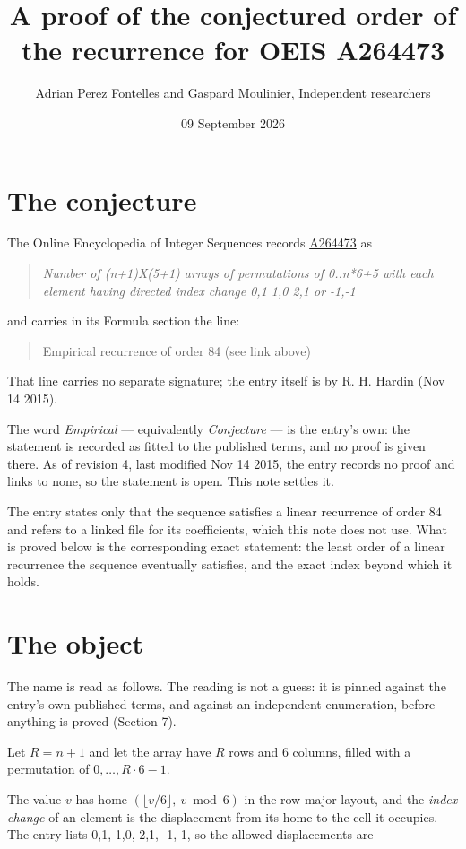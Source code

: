 \documentclass[11pt]{article}
\title{A proof of the conjectured order of the recurrence for OEIS A264473}
\author{Adrian Perez Fontelles and Gaspard Moulinier, Independent researchers}
\date{09 September 2026}
\theoremstyle{definition}
\begin{document}
\maketitle
\section{The conjecture}

The Online Encyclopedia of Integer Sequences records \href{https://oeis.org/A264473}{A264473} as

\begin{quote}\itshape Number of (n+1)X(5+1) arrays of permutations of 0..n*6+5 with each element having directed index change 0,1 1,0 2,1 or -1,-1\end{quote}

and carries in its Formula section the line:

\begin{quote}\ttfamily Empirical recurrence of order 84 (see link above)\end{quote}

That line carries no separate signature; the entry itself is by R. H. Hardin (Nov 14 2015).

The word {\itshape Empirical} --- equivalently {\itshape Conjecture} --- is the entry's own: the statement is recorded as fitted to the published terms, and no proof is given there. As of revision 4, last modified Nov 14 2015, the entry records no proof and links to none, so the statement is open. This note settles it.

The entry states only that the sequence satisfies a linear recurrence of order $84$ and refers to a linked file for its coefficients, which this note does not use. What is proved below is the corresponding exact statement: the least order of a linear recurrence the sequence eventually satisfies, and the exact index beyond which it holds.

\section{The object}

The name is read as follows. The reading is not a guess: it is pinned against the entry's own published terms, and against an independent enumeration, before anything is proved (Section 7).

Let $R = n + 1$ and let the array have $R$ rows and $6$ columns, filled with a permutation of $0,\dots,R\cdot6-1$.

The value $v$ has home $(\lfloor v/6\rfloor,\ v \bmod 6)$ in the row-major layout, and the {\itshape index change} of an element is the displacement from its home to the cell it occupies. The entry lists 0,1, 1,0, 2,1, -1,-1, so the allowed displacements are
\end{document}
